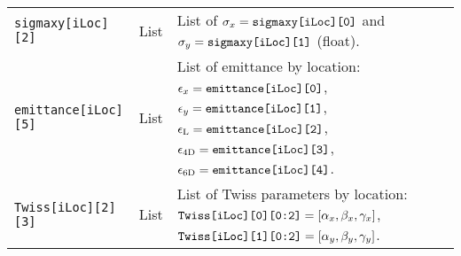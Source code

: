 \begin{sidewaystable}[h]
\begin{center}
\begin{tabular}{|l|c|p{12cm}|}
      \texttt{sigmaxy[iLoc][2]}   & List        & List of $\sigma_x={\rm \texttt{sigmaxy[iLoc][0]}}$ and
                                                  $\sigma_y={\rm \texttt{sigmaxy[iLoc][1]}}$ (float).                  \\
      \texttt{emittance[iLoc][5]} & List        & List of emittance by location:
                                                  $\epsilon_x      ={\rm \texttt{emittance[iLoc][0]}}$, 
                                                  $\epsilon_y      ={\rm \texttt{emittance[iLoc][1]}}$, 
                                                  $\epsilon_{\rm L} ={\rm \texttt{emittance[iLoc][2]}}$, 
                                                  $\epsilon_{\rm 4D}={\rm \texttt{emittance[iLoc][3]}}$, 
                                                  $\epsilon_{\rm 6D}={\rm \texttt{emittance[iLoc][4]}}$.                \\
      \texttt{Twiss[iLoc][2][3]}  & List        & List of Twiss parameters by location:
                                                  ${\rm \texttt{Twiss[iLoc][0][0:2]}}=[\alpha_x, \beta_x, \gamma_x]$, 
                                                  ${\rm \texttt{Twiss[iLoc][1][0:2]}}=[\alpha_y, \beta_y, \gamma_y]$.  \\
       \hline
    \end{tabular}
  \end{center}
\end{sidewaystable}
